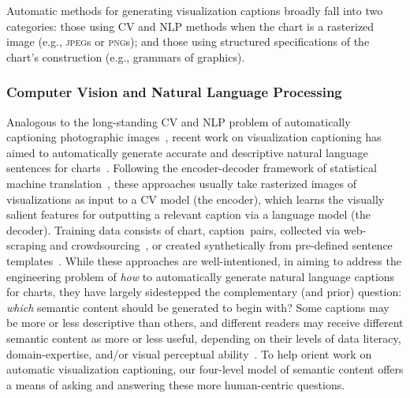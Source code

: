 Automatic methods for generating visualization captions broadly fall into two categories: those using \ac{CV} and \ac{NLP} methods when the chart is a rasterized image (e.g., \textsc{jpeg}s or \textsc{png}s); and those using structured specifications of the chart's construction (e.g., grammars of graphics).

\subsubsection{Computer Vision and Natural Language Processing}
Analogous to the long-standing \ac{CV} and \ac{NLP} problem of automatically captioning photographic images~\cite{lin_microsoft_2014, krishna_visual_2017, karpathy_deep_2017}, recent work on visualization captioning has aimed to automatically generate accurate and descriptive natural language sentences for charts~\cite{chen_neural_2019, chen_figure_2019, chen_figure_2020, balaji_chart-text_2018, obeid_chart--text_2020, lai_automatic_2020, qian_generating_2021}.
Following the encoder-decoder framework of statistical machine translation~\cite{vinyals_show_2015, xu_show_2016}, these approaches usually take rasterized images of visualizations as input to a \ac{CV} model (the encoder), which learns the visually salient features for outputting a relevant caption via a language model (the decoder).
Training data consists of \textlangle chart, caption\textrangle\, pairs, collected via web-scraping and crowdsourcing~\cite{qian_formative_2020}, or created synthetically from pre-defined sentence templates~\cite{kahou_figureqa_2018}.
While these approaches are well-intentioned, in aiming to address the engineering problem of \emph{how} to automatically generate natural language captions for charts, they have largely sidestepped the complementary (and prior) question: \emph{which} semantic content should be generated to begin with?
Some captions may be more or less descriptive than others, and different readers may receive different semantic content as more or less useful, depending on their levels of data literacy, domain-expertise, and/or visual perceptual ability~\cite{macleod_understanding_2017, morash_guiding_2015, moraes_evaluating_2014}.
To help orient work on automatic visualization captioning, our four-level model of semantic content offers a means of asking and answering these more human-centric questions.

